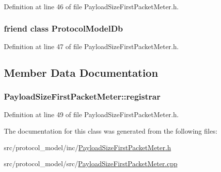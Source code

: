 Definition at line 46 of file Payload\-Size\-First\-Packet\-Meter.\-h.

\hypertarget{class_vsid_1_1_payload_size_first_packet_meter_a3c0d389e7a9476b06313d8fb9ca9fe68}{
\subsubsection[{Protocol\-Model\-Db}]{\setlength{\rightskip}{0pt plus 5cm}friend class {\bf Protocol\-Model\-Db}\hspace{0.3cm}{\ttfamily [friend]}}}\label{class_vsid_1_1_payload_size_first_packet_meter_a3c0d389e7a9476b06313d8fb9ca9fe68}


Definition at line 47 of file Payload\-Size\-First\-Packet\-Meter.\-h.



\subsection{Member Data Documentation}
\hypertarget{class_vsid_1_1_payload_size_first_packet_meter_af1a8cae3939b909b1c4b99d73d21f319}{
\subsubsection[{registrar}]{ Payload\-Size\-First\-Packet\-Meter\-::registrar\hspace{0.3cm}{\ttfamily [static]}}}\label{class_vsid_1_1_payload_size_first_packet_meter_af1a8cae3939b909b1c4b99d73d21f319}


Definition at line 49 of file Payload\-Size\-First\-Packet\-Meter.\-h.



The documentation for this class was generated from the following files\-:\begin{DoxyCompactItemize}
\item 
src/protocol\-\_\-model/inc/\hyperlink{_payload_size_first_packet_meter_8h}{Payload\-Size\-First\-Packet\-Meter.\-h}\item 
src/protocol\-\_\-model/src/\hyperlink{_payload_size_first_packet_meter_8cpp}{Payload\-Size\-First\-Packet\-Meter.\-cpp}\end{DoxyCompactItemize}
